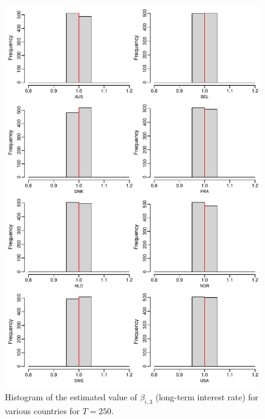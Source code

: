 \documentclass[a4paper,12pt]{article}
\begin{document}
\begin{enumerate}[label=\arabic*.,leftmargin=0.6cm]
{\begin{itemize}[topsep=0pt]
\begin{figure}[p!]
\begin{minipage}[t]{0.48\textwidth}
\includegraphics[width=\textwidth]{output/beta_ltrate_T_250}
\caption{Histogram of the estimated value of $\beta_{i, 3}$ (long-term interest rate) for various countries for $T = 250$.}\label{fig:para:ltrate:250}
\end{minipage}
\end{figure}


\end{itemize}}
\end{enumerate}
\end{document}
